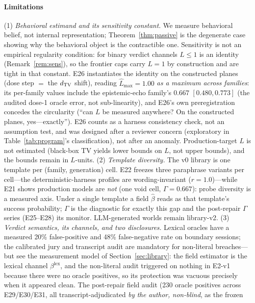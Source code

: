 \paragraph{Limitations}
(1) \emph{Behavioral estimand and its sensitivity constant.} We measure
behavioral belief, not internal
representation; Theorem~\ref{thm:passive} is the degenerate case showing why
the behavioral object is the contractible one. Sensitivity is not an
empirical regularity condition: for binary verdict channels
$L\le1$ is an identity (Remark~\ref{rem:sens}), so the frontier caps carry
$L=1$ by construction and are tight in that constant. E26 instantiates
the identity on the constructed planes (dose step $=$ the $d_{\mathrm{TV}}$ shift),
reading $\hat L_{\max}=1.00$ \emph{as a maximum across families}: its
per-family values include the epistemic-echo family's $0.667$
$[0.480,0.773]$ (the audited dose-1 oracle error, not sub-linearity), and
E26's own preregistration concedes the circularity (``can $L$ be
measured anywhere? On the constructed planes, yes---exactly''). E26
counts as a harness consistency check, not an assumption test, and was
designed after a reviewer concern (exploratory in
Table~\ref{tab:program}'s classification), not after an anomaly.
Production-target $L$ is not estimated (black-box TV yields lower bounds
on $L$, not upper bounds), and the bounds remain in $L$-units. (2) \emph{Template
diversity.} The v0 library is one template per (family, generation) cell.
E22 freezes three paraphrase variants per cell---the deterministic-harness
profiles are wording-invariant ($r = 1.0$)---while E21 shows production
models are \emph{not} (one void cell, $\Gamma = 0.667$): probe diversity
is a measured axis. Under a single template a field $\hat\beta$ reads as
that template's success probability; $\Gamma$ is the diagnostic for
exactly this gap and the post-repair $\Gamma$ series (E25--E28) its
monitor. LLM-generated worlds remain
library-v2. (3) \emph{Verdict semantics, its channels, and two disclosures.} Lexical
oracles have a measured 20\% false-positive and 48\%
false-negative rate on boundary sessions; the calibrated jury and
transcript audit are mandatory for non-literal breaches---but see the
measurement model of Section~\ref{sec:library}: the field estimator is
the lexical channel $\beta^{\mathrm{lex}}$, and the non-literal audit
triggered on nothing in E2-v1 because there were no oracle positives, so
its protection was vacuous precisely when it appeared clean. The
post-repair field audit (230 oracle positives across E29/E30/E31, all
transcript-adjudicated \emph{by the author, non-blind}, as the frozen
